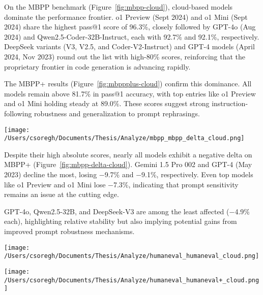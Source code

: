 On the MBPP benchmark (Figure~\ref{fig:mbpp-cloud}), cloud-based models dominate the performance frontier. o1 Preview (Sept 2024) and o1 Mini (Sept 2024) share the highest pass@1 score of 96.3\%, closely followed by GPT-4o (Aug 2024) and Qwen2.5-Coder-32B-Instruct, each with 92.7\% and 92.1\%, respectively. DeepSeek variants (V3, V2.5, and Coder-V2-Instruct) and GPT-4 models (April 2024, Nov 2023) round out the list with high-80\% scores, reinforcing that the proprietary frontier in code generation is advancing rapidly.

The MBPP+ results (Figure~\ref{fig:mbppplus-cloud}) confirm this dominance. All models remain above 81.7\% in pass@1 accuracy, with top entries like o1 Preview and o1 Mini holding steady at 89.0\%. These scores suggest strong instruction-following robustness and generalization to prompt rephrasings.

\begin{center}
	\texttt{[image: /Users/csoregh/Documents/Thesis/Analyze/mbpp\_mbpp\_delta\_cloud.png]}
	\label{fig:mbpp-delta-cloud}
\end{center}

Despite their high absolute scores, nearly all models exhibit a negative delta on MBPP+ (Figure~\ref{fig:mbpp-delta-cloud}). Gemini 1.5 Pro 002 and GPT-4 (May 2023) decline the most, losing −9.7\% and −9.1\%, respectively. Even top models like o1 Preview and o1 Mini lose −7.3\%, indicating that prompt sensitivity remains an issue at the cutting edge.

GPT-4o, Qwen2.5-32B, and DeepSeek-V3 are among the least affected (−4.9\% each), highlighting relative stability but also implying potential gains from improved prompt robustness mechanisms.

\begin{center}
	\texttt{[image: /Users/csoregh/Documents/Thesis/Analyze/humaneval\_humaneval\_cloud.png]}
	\label{fig:humaneval-cloud}
\end{center}

\begin{center}
	\texttt{[image: /Users/csoregh/Documents/Thesis/Analyze/humaneval\_humaneval+\_cloud.png]}
	\label{fig:humanevalplus-cloud}
\end{center}


